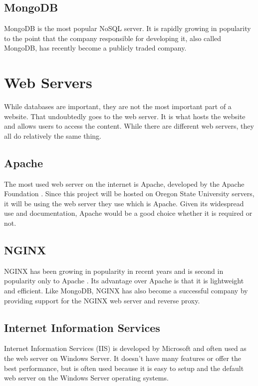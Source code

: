\documentclass[10pt,draftclsnofoot,onecolumn,journal,compsoc]{IEEEtran}
\begin{document}
\subsection{MongoDB}
MongoDB is the most popular NoSQL server. It is rapidly growing in popularity to the point that the company responsible for developing it, also called MongoDB, has recently become a publicly traded company.

\section{Web Servers}
While databases are important, they are not the most important part of a website. That undoubtedly goes to the web server. It is what hosts the website and allows users to access the content. While there are different web servers, they all do relatively the same thing.

\subsection{Apache}
The most used web server on the internet is Apache, developed by the Apache Foundation \cite{webserverstats}. Since this project will be hosted on Oregon State University servers, it will be using the web server they use which is Apache. Given its widespread use and documentation, Apache would be a good choice whether it is required or not.

\subsection{NGINX}
NGINX has been growing in popularity in recent years and is second in popularity only to Apache \cite{webserverstats}. Its advantage over Apache is that it is lightweight and efficient. Like MongoDB, NGINX has also become a successful company by providing support for the NGINX web server and reverse proxy.

\subsection{Internet Information Services}
Internet Information Services (IIS) is developed by Microsoft and often used as the web server on Windows Server. It doesn't have many features or offer the best performance, but is often used because it is easy to setup and the default web server on the Windows Server operating systems.
\end{document}
